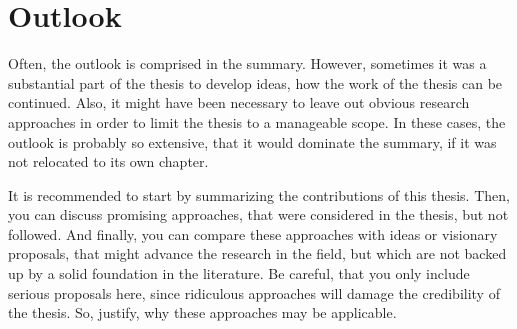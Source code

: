 \chapter{Outlook}

Often, the outlook is comprised in the summary.
However, sometimes it was a substantial part of the thesis to develop ideas, how the work of the thesis can be continued.
Also, it might have been necessary to leave out obvious research approaches in order to limit the thesis to a manageable scope.
In these cases, the outlook is probably so extensive, that it would dominate the summary, if it was not relocated to its own chapter.

It is recommended to start by summarizing the contributions of this thesis.
Then, you can discuss promising approaches, that were considered in the thesis, but not followed.
And finally, you can compare these approaches with ideas or visionary proposals, that might advance the research in the field, but which are not backed up by a solid foundation in the literature.
Be careful, that you only include serious proposals here, since ridiculous approaches will damage the credibility of the thesis.
So, justify, why these approaches may be applicable.
